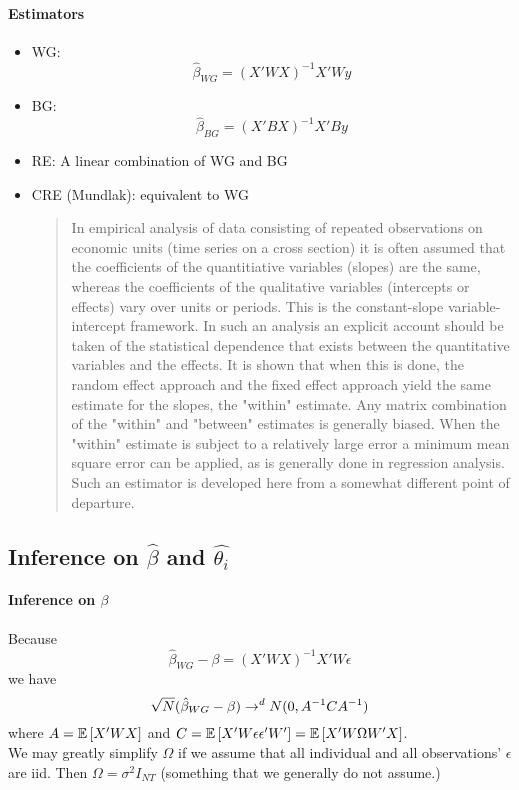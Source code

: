 \paragraph{Estimators}
\begin{itemize}
    \item WG: \begin{equation*}
              \hat{\beta}_{WG}=(X'WX)^{-1}X'W y
          \end{equation*}
    \item BG: \begin{equation*}
              \hat{\beta}_{BG}=(X'B X)^{-1}X'By\end{equation*}
    \item RE: A linear combination of WG and BG
    \item CRE (Mundlak): equivalent to WG
          \begin{quote}
              In empirical analysis of data consisting of repeated observations on economic units (time series on a cross section) it is often assumed that the coefficients of the quantitiative variables (slopes) are the same, whereas the coefficients of the qualitative variables (intercepts or effects) vary over units or periods. This is the constant-slope variable- intercept framework. In such an analysis an explicit account should be taken of the statistical dependence that exists between the quantitative variables and the effects. It is shown that when this is done, the random effect approach and the fixed effect approach yield the same estimate for the slopes, the "within" estimate. Any matrix combination of the "within" and "between" estimates is generally biased. When the "within" estimate is subject to a relatively large error a minimum mean square error can be applied, as is generally done in regression analysis. Such an estimator is developed here from a somewhat different point of departure.
          \end{quote}
\end{itemize}
\subsection{Inference on $\hat{\beta}$ and $\hat{\theta_i}$}
\paragraph{Inference on $\beta$} Because
\begin{equation*}
    \hat{\beta}_{WG}-\beta = (X'WX)^{-1}X'W\epsilon
\end{equation*}
we have \begin{equation*}
    \sqrt{N}(\hat{\beta}_{WG}-\beta) \to^d N(0, A^{-1}C A^{-1})\\
\end{equation*}
where $A = \mathbb{E}\left[X'WX\right]$ and $C = \mathbb{E}\left[X'W\epsilon \epsilon'W'\right]=\mathbb{E}\left[X'W\Omega W'X\right]$.\\
We may greatly simplify $\Omega$ if we assume that all individual and all observations' $\epsilon$ are iid. Then $\Omega = \sigma^2 I_{NT}$ (something that we generally do not assume.)\\

